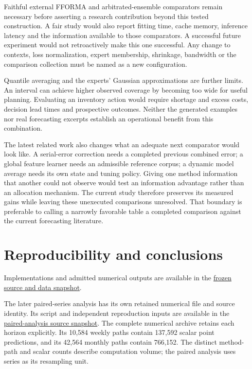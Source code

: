 \documentclass[11pt,a4paper]{article}
\begin{document}
Faithful external FFORMA and arbitrated-ensemble comparators remain necessary before asserting a research contribution beyond this tested construction. A fair study would also report fitting time, cache memory, inference latency and the information available to those comparators. A successful future experiment would not retroactively make this one successful. Any change to contexts, loss normalization, expert membership, shrinkage, bandwidth or the comparison collection must be named as a new configuration.

Quantile averaging and the experts' Gaussian approximations are further limits. An interval can achieve higher observed coverage by becoming too wide for useful planning. Evaluating an inventory action would require shortage and excess costs, decision lead times and prospective outcomes. Neither the generated examples nor real forecasting excerpts establish an operational benefit from this combination.

The latest related work also changes what an adequate next comparator would look like. A serial-error correction needs a completed previous combined error; a global feature learner needs an admissible reference corpus; a dynamic model average needs its own state and tuning policy. Giving one method information that another could not observe would test an information advantage rather than an allocation mechanism. The current study therefore preserves its measured gains while leaving these unexecuted comparisons unresolved. That boundary is preferable to calling a narrowly favorable table a completed comparison against the current forecasting literature.

\section{Reproducibility and conclusions}
Implementations and admitted numerical outputs are available in the \href{https://github.com/fsantibanezleal/CAOS_RES_ChronoScope/tree/d702831a7660f9fb8123798a2e3bbf5e47887bce}{frozen source and data snapshot}.

The later paired-series analysis has its own retained numerical file and source identity. Its script and independent reproduction inputs are available in the \href{https://github.com/fsantibanezleal/CAOS_RES_ChronoScope/tree/8b7d89b9df1cfd9e627fd29a598873de94e95a6e}{paired-analysis source snapshot}. The complete numerical archive retains each horizon explicitly. Its 10,584 weekly paths contain 137,592 scalar point predictions, and its 42,564 monthly paths contain 766,152. The distinct method-path and scalar counts describe computation volume; the paired analysis uses series as its resampling unit.
\end{document}
